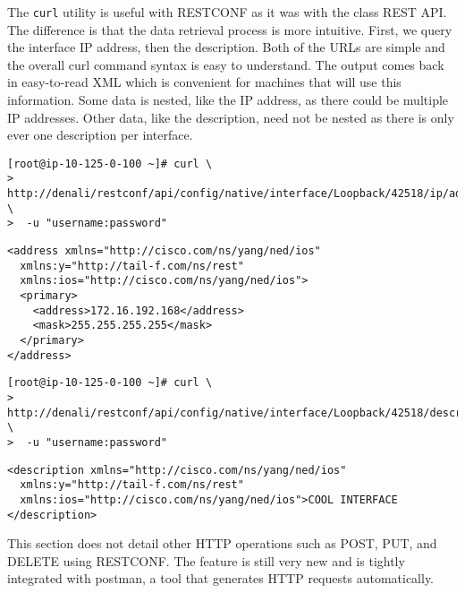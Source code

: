 The \verb|curl| utility is useful with RESTCONF as it was with the class REST
API\@. The difference is that the data retrieval process is more intuitive.
First, we query the interface IP address, then the description. Both of the
URLs are simple and the overall curl command syntax is easy to understand. The
output comes back in easy-to-read XML which is convenient for machines that
will use this information. Some data is nested, like the IP address, as there
could be multiple IP addresses. Other data, like the description, need not be
nested as there is only ever one description per interface.

\begin{verbatim}
[root@ip-10-125-0-100 ~]# curl \
>  http://denali/restconf/api/config/native/interface/Loopback/42518/ip/address \
>  -u "username:password"
\end{verbatim}

\begin{verbatim}
<address xmlns="http://cisco.com/ns/yang/ned/ios"
  xmlns:y="http://tail-f.com/ns/rest"
  xmlns:ios="http://cisco.com/ns/yang/ned/ios">
  <primary>
    <address>172.16.192.168</address>
    <mask>255.255.255.255</mask>
  </primary>
</address>
\end{verbatim}

\begin{verbatim}
[root@ip-10-125-0-100 ~]# curl \
>  http://denali/restconf/api/config/native/interface/Loopback/42518/description \
>  -u "username:password"
\end{verbatim}

\begin{verbatim}
<description xmlns="http://cisco.com/ns/yang/ned/ios"
  xmlns:y="http://tail-f.com/ns/rest"
  xmlns:ios="http://cisco.com/ns/yang/ned/ios">COOL INTERFACE
</description>
\end{verbatim}

This section does not detail other HTTP operations such as POST, PUT, and
DELETE using RESTCONF\@. The feature is still very new and is tightly integrated
with postman, a tool that generates HTTP requests automatically.
